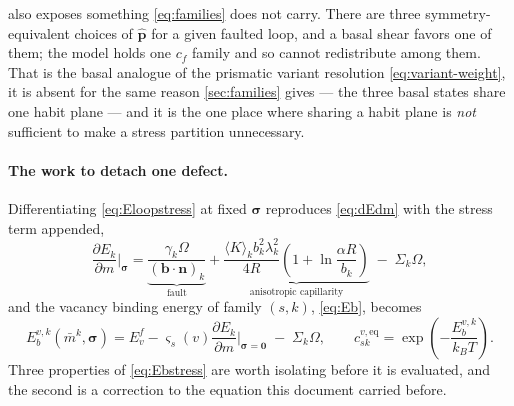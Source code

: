 \documentclass{article}
\newcommand{\bvec}{\bm b}
\newcommand{\nvec}{\bm n}
\begin{document}
 also exposes something \cref{eq:families} does not carry.
There are three symmetry-equivalent choices of $\hat{\bm p}$ for a given faulted
loop, and a basal shear favors one of them; the model holds one $c_f$ family and
so cannot redistribute among them. That is the basal analogue of the prismatic
variant resolution \cref{eq:variant-weight}, it is absent for the same reason
\cref{sec:families} gives --- the three basal states share one habit plane --- and
it is the one place where sharing a habit plane is \emph{not} sufficient to make
a stress partition unnecessary.

\paragraph{The work to detach one defect.} Differentiating \cref{eq:Eloopstress}
at fixed $\bm\sigma$ reproduces \cref{eq:dEdm} with the stress term appended,
\begin{equation}
  \frac{\partial E_k}{\partial m}\bigg|_{\bm\sigma}
  =\underbrace{\frac{\gamma_k\Omega}{(\bvec\!\cdot\!\nvec)_k}}_{\text{fault}}
  +\underbrace{\frac{\langle K\rangle_kb_k^2\lambda_k^2}{4R}
      \left(1+\ln\frac{\alpha R}{b_k}\right)}_{\text{anisotropic capillarity}}
  \;-\;\Sigma_k\Omega ,
  \label{eq:dEdmstress}
\end{equation}
and the vacancy binding energy of family $(s,k)$, \cref{eq:Eb}, becomes
\begin{equation}
  E^{v,k}_b(\bar m^k,\bm\sigma)
   =E^f_v-\varsigma_s(v)\frac{\partial E_k}{\partial m}\bigg|_{\bm\sigma=\bm0}
        \;-\;\Sigma_k\Omega ,
  \qquad
  c^{v,\mathrm{eq}}_{sk}=\exp\!\left(-\frac{E^{v,k}_b}{k_BT}\right).
  \label{eq:Ebstress}
\end{equation}
Three properties of \cref{eq:Ebstress} are worth isolating before it is
evaluated, and the second is a correction to the equation this document carried
before.
\end{document}
